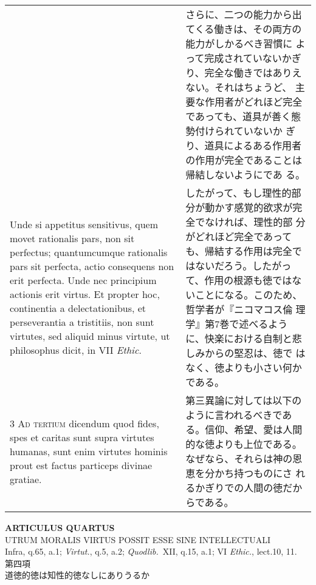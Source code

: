 \documentclass[10pt]{jsarticle}
\begin{document}
\begin{longtable}{p{21em}p{21em}}
&

さらに、二つの能力から出てくる働きは、その両方の能力がしかるべき習慣に
よって完成されていないかぎり、完全な働きではありえない。それはちょうど、
主要な作用者がどれほど完全であっても、道具が善く態勢付けられていないか
ぎり、道具によるある作用者の作用が完全であることは帰結しないようにであ
る。

\\


Unde si appetitus sensitivus, quem movet rationalis pars, non sit
perfectus; quantumcumque rationalis pars sit perfecta, actio
consequens non erit perfecta. Unde nec principium actionis erit
virtus. Et propter hoc, continentia a delectationibus, et
perseverantia a tristitiis, non sunt virtutes, sed aliquid minus
virtute, ut philosophus dicit, in VII {\itshape Ethic}.

&

したがって、もし理性的部分が動かす感覚的欲求が完全でなければ、理性的部
分がどれほど完全であっても、帰結する作用は完全ではないだろう。したがっ
て、作用の根源も徳ではないことになる。このため、哲学者が『ニコマコス倫
理学』第7巻で述べるように、快楽における自制と悲しみからの堅忍は、徳で
はなく、徳よりも小さい何かである。


\\



3 {\scshape Ad tertium} dicendum quod fides, spes et caritas sunt
supra virtutes humanas, sunt enim virtutes hominis prout est factus
particeps divinae gratiae.

&

第三異論に対しては以下のように言われるべきである。信仰、希望、愛は人間
的な徳よりも上位である。なぜなら、それらは神の恩恵を分かち持つものにさ
れるかぎりでの人間の徳だからである。

\end{longtable}
\newpage



\begin{center}
{\Large {\bf ARTICULUS QUARTUS}}\\
{\large UTRUM MORALIS VIRTUS POSSIT ESSE SINE INTELLECTUALI}\\
{\footnotesize Infra, q.65, a.1; {\itshape Virtut.}, q.5, a.2; {\itshape Quodlib.}~XII, q.15, a.1; VI {\itshape Ethic.}, lect.10, 11.}\\
{\Large 第四項\\道徳的徳は知性的徳なしにありうるか}
\end{center}
\end{document}

